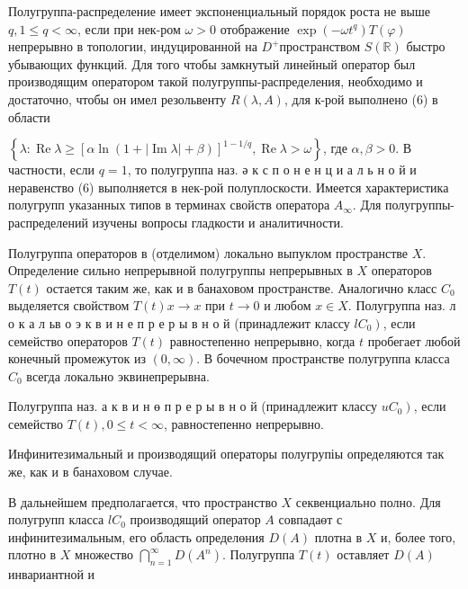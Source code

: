 \documentclass[10pt]{article}
\begin{document}
Полугруппа-распределение имеет экспоненциальный порядок роста не выше $q, 1 \leqslant q<\infty$, если при нек-ром $\omega>0$ отображение $\exp \left(-\omega t^{q}\right) T(\varphi)$ непрерывно в топологии, индуцированной на $D^{+}$пространством $S(\mathbb{R})$ быстро убывающих функций. Для того чтобы замкнутый линейный оператор был производящим оператором такой полугруппы-распределения, необходимо и достаточно, чтобы он имел резольвенту $R(\lambda, A)$, для к-рой выполнено (6) в области



$\left\{\lambda: \operatorname{Re} \lambda \geqslant[\alpha \ln (1+|\operatorname{Im} \lambda|+\beta)]^{1-1 / q}, \operatorname{Re} \lambda>\omega\right\}$, где $\alpha, \beta>0$. В частности, если $q=1$, то полугруппа наз. ә к с п о н е н ц и а л ь н о й и неравенство (6) выполняется в нек-рой полуплоскости. Имеется характеристика полугрупп указанных типов в терминах свойств оператора $A_{\infty}$. Для полугруппы-распределений изучены вопросы гладкости и аналитичности.



Полугруппа операторов в (отделимом) локально выпуклом пространстве $X$. Определение сильно непрерывной полугруппы непрерывных в $X$ операторов $T(t)$ остается таким же, как и в банаховом пространстве. Аналогично класс $C_{0}$ выделяется свойством $T(t) x \rightarrow x$ при $t \rightarrow 0$ и любом $x \in X$. Полугруппа наз. л о к а л ьв о э к в и н е п р е р ы в н о й (принадлежит классу $\left.l C_{0}\right)$, если семейство операторов $T(t)$ равностепенно непрерывно, когда $t$ пробегает любой конечный промежуток из $(0, \infty)$. В бочечном пространстве полугруппа класса $C_{0}$ всегда локально эквинепрерывна.



Полугруппа наз. а к в и н ө п р е р ы в н о й (принадлежит классу $\left.u C_{0}\right)$, если семейство $T(t), 0 \leqslant t<\infty$, равностепенно непрерывно.



Инфинитезимальный и производящий операторы полугрупіы определяются так же, как и в банаховом случае.



В дальнейшем предполагается, что пространство $X$ секвенциально полно. Для полугрупп класса $l C_{0}$ производящий оператор $A$ совпадаөт с инфинитезимальным, его область определөния $D(A)$ плотна в $X$ и, более того, плотно в $X$ множество $\bigcap_{n=1}^{\infty} D\left(A^{n}\right)$. Полугруппа $T(t)$ оставляет $D(A)$ инвариантной и
\end{document}
